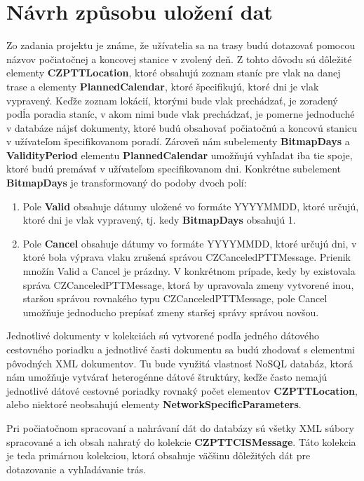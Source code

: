\documentclass[10pt,xcolor=pdflatex,dvipsnames,table,oneside]{book}
\begin{document}
\chapter{Návrh způsobu uložení dat}
\par Zo zadania projektu je známe, že užívatelia sa na trasy budú dotazovať pomocou názvov počiatočnej a koncovej stanice v zvolený deň. Z tohto dôvodu sú dôležité elementy \textbf{CZPTTLocation}, ktoré obsahujú zoznam staníc pre vlak na danej trase a elementy \textbf{PlannedCalendar}, ktoré špecifikujú, ktoré dni je vlak vypravený. Keďže zoznam lokácií, ktorými bude vlak prechádzať, je zoradený podĺa poradia staníc, v akom nimi bude vlak prechádzať, je pomerne jednoduché v databáze nájsť dokumenty, ktoré budú obsahovať počiatočnú a koncovú stanicu v užívateľom špecifikovanom poradí. Zároveň nám subelementy \textbf{BitmapDays} a \textbf{ValidityPeriod} elementu \textbf{PlannedCalendar} umožňujú vyhľadat iba tie spoje, ktoré budú premávať v užívateľom specifikovanom dni.
Konkrétne subelement \textbf{BitmapDays} je transformovaný do podoby dvoch polí:
\begin{enumerate}
    \item Pole \textbf{Valid} obsahuje dátumy uložené vo formáte YYYYMMDD, ktoré určujú, ktoré dni je vlak vypravený, tj. kedy \textbf{BitmapDays} obsahujú 1.
    \item Pole \textbf{Cancel} obsahuje dátumy vo formáte YYYYMMDD, ktoré určujú dni, v ktoré bola výprava vlaku zrušená správou CZCanceledPTTMessage. Prienik množín Valid a Cancel je prázdny. V konkrétnom prípade, kedy by existovala správa CZCanceledPTTMessage, ktorá by upravovala zmeny vytvorené inou, staršou správou rovnakého typu CZCanceledPTTMessage, pole Cancel umožňuje jednoducho prepísať zmeny staršej správy správou novšou.
\end{enumerate}
\par Jednotlivé dokumenty v kolekciách sú vytvorené podľa jedného dátového cestovného poriadku a jednotlivé časti dokumentu sa budú zhodovať s elementmi pôvodných XML dokumentov. Tu bude využitá vlastnosť NoSQL databáz, ktorá nám umožňuje vytvárať heterogénne dátové štruktúry, keďže často nemajú jednotlivé dátové cestovné poriadky rovnaký počet elementov \textbf{CZPTTLocation}, alebo niektoré neobsahujú elementy \textbf{NetworkSpecificParameters}.
\par Pri počiatočnom spracovaní a nahrávaní dát do databázy sú všetky XML súbory spracované a ich obsah nahratý do kolekcie \textbf{CZPTTCISMessage}. Táto kolekcia je teda primárnou kolekciou, ktorá obsahuje väčšinu dôležitých dát pre dotazovanie a vyhľadávanie trás.
\end{document}
